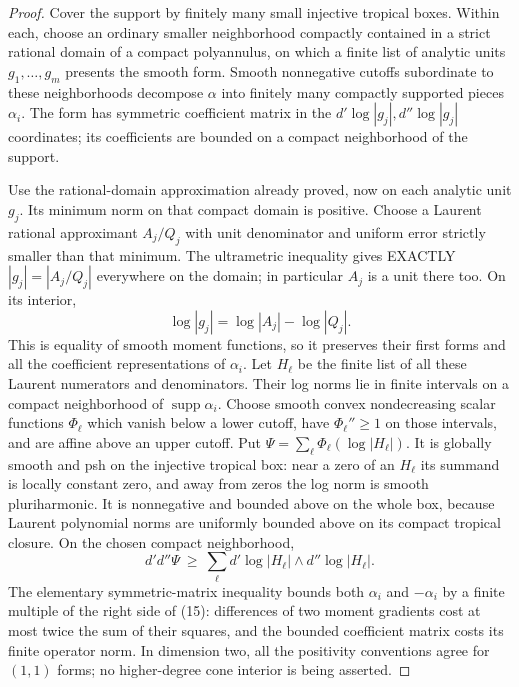 \begin{proof}
Cover the support by finitely many small injective tropical boxes. Within each,
choose an ordinary smaller neighborhood compactly contained in a strict
rational domain of a compact polyannulus, on which a finite list of analytic
units $g_1,\ldots,g_m$ presents the smooth form.
Smooth nonnegative cutoffs subordinate to these neighborhoods decompose
$\alpha$ into finitely many compactly supported pieces $\alpha_i$.
The form has symmetric coefficient matrix in the $d'\log|g_j|,
 d''\log|g_j|$ coordinates; its coefficients are bounded on a compact
neighborhood of the support.

Use the rational-domain approximation already proved, now on each analytic
unit $g_j$. Its minimum norm on that compact domain is positive.
Choose a Laurent rational approximant $A_j/Q_j$ with unit denominator and
uniform error strictly smaller than that minimum. The ultrametric inequality
gives EXACTLY $|g_j|=|A_j/Q_j|$ everywhere on the domain; in particular
$A_j$ is a unit there too. On its interior,
\[
 \log|g_j|=\log|A_j|-\log|Q_j|.
\]
This is equality of smooth moment functions, so it preserves their first
forms and all the coefficient representations of $\alpha_i$.
Let $H_\ell$ be the finite list of all these Laurent numerators and denominators.
Their log norms lie in finite intervals on a compact neighborhood of
$\operatorname{supp}\alpha_i$.
Choose smooth convex nondecreasing scalar functions $\Phi_\ell$ which vanish
below a lower cutoff, have $\Phi_\ell''\ge1$ on those intervals, and are
affine above an upper cutoff. Put
$\Psi=\sum_\ell\Phi_\ell(\log|H_\ell|)$.
It is globally smooth and psh on the injective tropical box: near a zero of
an $H_\ell$ its summand is locally constant zero, and away from zeros the
log norm is smooth pluriharmonic. It is nonnegative and bounded above on
the whole box, because Laurent polynomial norms are uniformly bounded above
on its compact tropical closure. On the chosen compact neighborhood,
\[
 d'd''\Psi\ \ge\ \sum_\ell
 d'\log|H_\ell|\wedge d''\log|H_\ell|.                     \tag{15}
\]
The elementary symmetric-matrix inequality bounds both $\alpha_i$ and
$-\alpha_i$ by a finite multiple of the right side of (15): differences of
two moment gradients cost at most twice the sum of their squares, and the
bounded coefficient matrix costs its finite operator norm. In dimension two,
all the positivity conventions agree for $(1,1)$ forms; no higher-degree
cone interior is being asserted.


\end{proof}
